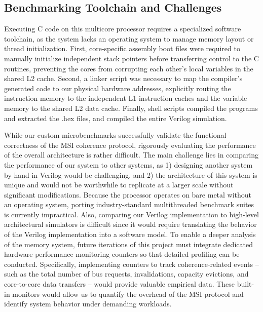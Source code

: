 \documentclass[10pt, compsoc]{IEEEtran}
\begin{document}
\subsection{Benchmarking Toolchain and Challenges}

Executing C code on this multicore processor requires a specialized software toolchain, as the system lacks an operating system to manage memory layout or thread initialization. First, core-specific assembly boot files were required to manually initialize independent stack pointers before transferring control to the C routines, preventing the cores from corrupting each other's local variables in the shared L2 cache. Second, a linker script was necessary to map the compiler's generated code to our physical hardware addresses, explicitly routing the instruction memory to the independent L1 instruction caches and the variable memory to the shared L2 data cache. Finally, shell scripts compiled the programs and extracted the .hex files, and compiled the entire Verilog simulation.





While our custom microbenchmarks successfully validate the functional correctness of the MSI coherence protocol, rigorously evaluating the performance of the overall architecture is rather difficult. The main challenge lies in comparing the performance of our system to other systems, as 1) designing another system by hand in Verilog would be challenging, and 2) the architecture of this system is unique and would not be worthwhile to replicate at a larger scale without significant modifications. Because the processor operates on bare metal without an operating system, porting industry-standard multithreaded benchmark suites is currently impractical. Also, comparing our Verilog implementation to high-level architectural simulators is difficult since it would require translating the behavior of the Verilog implementation into a software model. To enable a deeper analysis of the memory system, future iterations of this project must integrate dedicated hardware performance monitoring counters so that detailed profiling can be conducted. Specifically, implementing counters to track coherence-related events -- such as the total number of bus requests, invalidations, capacity evictions, and core-to-core data transfers -- would provide valuable empirical data. These built-in monitors would allow us to quantify the overhead of the MSI protocol and identify system behavior under demanding workloads.
\end{document}
